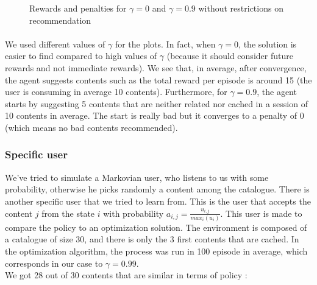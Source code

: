 \documentclass[a4paper]{article}
\begin{document}
		\begin{figure}[h!]
    \centering
    \qquad
    \caption{Rewards and penalties for $\gamma = 0$ and $\gamma = 0.9$ without restrictions on recommendation }%
    \label{fig:example}%
    \end{figure}
	
 \paragraph{} We used different values of $\gamma$ for the plots. In fact, when $\gamma = 0$, the solution is easier to find compared to high values of $\gamma$ (because it should consider future rewards and not immediate rewards). We see that, in average, after convergence, the agent suggests contents such as the total reward per episode is around 15 (the user is consuming in average 10 contents). Furthermore, for $\gamma = 0.9$, the agent starts by suggesting 5 contents that are neither related nor cached in a session of 10 contents in average. The start is really bad but it converges to a penalty of 0 (which means no bad contents recommended).
 
 \subsubsection{Specific user}
 We've tried to simulate a Markovian user, who listens to us with some probability, otherwise he picks randomly a content among the catalogue. 
 There is another specific user that we tried to learn from. This is the user that accepts the content $j$ from the state $i$ with probability $a_{i,j} = \frac{u_{i,j}}{max_i (u_i)}$. This user is made to compare the policy to an optimization solution. The environment is composed of a catalogue of size 30, and there is only the 3 first contents that are cached. In the optimization algorithm, the process was run in 100 episode in average, which corresponds in our case to $\gamma = 0.99$. \\
 We got 28 out of 30 contents that are similar in terms of policy : 
 
\end{document}
